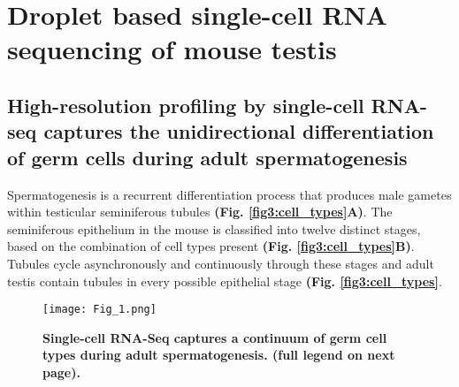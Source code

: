 
\section{Droplet based single-cell RNA sequencing of mouse testis}
\subsection*{High-resolution profiling by single-cell RNA-seq captures the unidirectional differentiation of germ cells during adult spermatogenesis}

Spermatogenesis is a recurrent differentiation process that produces male gametes within testicular seminiferous tubules \textbf{(Fig. \ref{fig3:cell_types}A)}. The seminiferous epithelium in the mouse is classified into twelve distinct stages, based on the combination of cell types present \textbf{(Fig. \ref{fig3:cell_types}B)}. Tubules cycle asynchronously and continuously through these stages and adult testis contain tubules in every possible epithelial stage \textbf{(Fig. \ref{fig3:cell_types}}. \\

\begin{figure}[!h]
\centering
\texttt{[image: Fig\_1.png]}
\caption[Droplet based scRNAseq of mouse spermatogenesis]{\textbf{Single-cell RNA-Seq captures a continuum of germ cell types during adult spermatogenesis. (full legend on next page).}\\}
\label{fig2:cell_types}
\end{figure}

